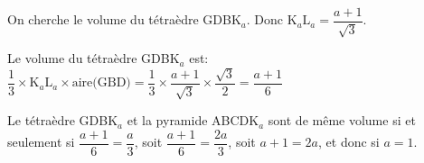 \begin{enumerate}
\begin{enumerate}
\begin{list}{\textbullet}{On cherche le volume du tétraèdre GDBK$_a$.}
Donc $\text{K}_a\text{L}_a = \dfrac{a+1}{\sqrt{3}}$.
\item Le volume du tétraèdre GDBK$_a$ est:\\
$\dfrac{1}{3}\times \text{K}_a\text{L}_a \times \text{aire(GBD)}
= \dfrac{1}{3} \times \dfrac{a+1}{\sqrt{3}} \times \dfrac{\sqrt{3}}{2}
= \dfrac{a+1}{6}$
\end{list}		

Le tétraèdre GDBK$_a$ et la pyramide ABCDK$_a$ sont de même volume si et seulement si $\dfrac{a+1}{6}=\dfrac{a}{3}$, soit $\dfrac{a+1}{6}=\dfrac{2a}{3}$, soit $a+1=2a$, et donc si $a=1$.
	\end{enumerate}
\end{enumerate}

\bigskip
